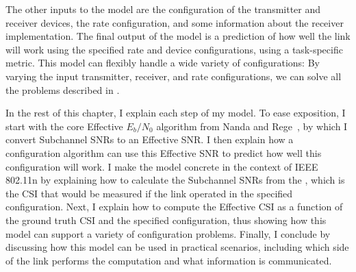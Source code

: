 The other inputs to the model are the configuration of the transmitter and receiver devices, the rate configuration, and some information about the receiver implementation. The final output of the model is a prediction of how well the link will work using the specified rate and device configurations, using a task-specific metric. This model can flexibly handle a wide variety of configurations: By varying the input transmitter, receiver, and rate configurations, we can solve all the problems described in .

In the rest of this chapter, I explain each step of my model. To ease exposition, I start with the core Effective $E_b/N_0$ algorithm from Nanda and Rege~\cite{Nanda_EffectiveSNR}, by which I convert Subchannel SNRs to an Effective SNR. I then explain how a configuration algorithm can use this Effective SNR to predict how well this configuration will work. I make the model concrete in the context of IEEE 802.11n by explaining how to calculate the Subchannel SNRs from the , which is the CSI that would be measured if the link operated in the specified configuration. Next, I explain how to compute the Effective CSI as a function of the ground truth CSI and the specified configuration, thus showing how this model can support a variety of configuration problems. Finally, I conclude by discussing how this model can be used in practical scenarios, including which side of the link performs the computation and what information is communicated.

